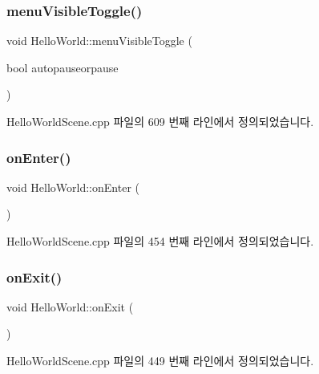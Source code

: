 \subsubsection{\texorpdfstring{menu\+Visible\+Toggle()}{menuVisibleToggle()}}
{\footnotesize\ttfamily void Hello\+World\+::menu\+Visible\+Toggle (\begin{DoxyParamCaption}\item[{bool}]{autopauseorpause }\end{DoxyParamCaption})\hspace{0.3cm}{\ttfamily [protected]}}



Hello\+World\+Scene.\+cpp 파일의 609 번째 라인에서 정의되었습니다.

\mbox{\label{class_hello_world_a0e47c5b1692f5ba74b776be85422dc75}} 
\subsubsection{\texorpdfstring{on\+Enter()}{onEnter()}}
{\footnotesize\ttfamily void Hello\+World\+::on\+Enter (\begin{DoxyParamCaption}{ }\end{DoxyParamCaption})\hspace{0.3cm}{\ttfamily [virtual]}}



Hello\+World\+Scene.\+cpp 파일의 454 번째 라인에서 정의되었습니다.

\mbox{\label{class_hello_world_a348da8e1c3061248666676878e692572}} 
\subsubsection{\texorpdfstring{on\+Exit()}{onExit()}}
{\footnotesize\ttfamily void Hello\+World\+::on\+Exit (\begin{DoxyParamCaption}{ }\end{DoxyParamCaption})\hspace{0.3cm}{\ttfamily [virtual]}}



Hello\+World\+Scene.\+cpp 파일의 449 번째 라인에서 정의되었습니다.

